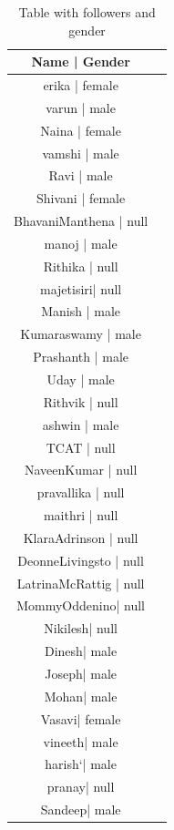 \begin{table}

\caption{Table with followers and gender}
\label{Table:q1table1}
\begin{center}
\begin{tabular}{| c | c |}
\hline

 Name | Gender\\ \hline
 erika  | female\\ \hline		
 varun  | male\\ \hline		
 Naina  | female\\ \hline		
 vamshi | male\\ \hline		
 Ravi  | male\\ \hline
 Shivani  | female\\ \hline	
 BhavaniManthena    | null\\ \hline
 manoj | male\\ \hline
 Rithika  | null\\ \hline	
 majetisiri| null\\ \hline
 Manish  | male\\ \hline	
 Kumaraswamy | male\\ \hline
 Prashanth  | male\\ \hline	
 Uday  | male\\ \hline
 Rithvik | null\\ \hline
 ashwin | male\\ \hline	
 TCAT | null\\ \hline
 NaveenKumar   | null\\ \hline	
 pravallika | null\\ \hline
 maithri  | null\\ \hline	
 KlaraAdrinson  | null\\ \hline
 DeonneLivingsto  | null\\ \hline
 LatrinaMcRattig  | null\\ \hline
MommyOddenino| 		null\\ \hline		
Nikilesh|	null\\ \hline		
Dinesh| 	male\\ \hline		
Joseph|	male\\ \hline		
Mohan| 		male\\ \hline
Vasavi|		female\\ \hline	
vineeth| 	male\\ \hline
harish`| 	male\\ \hline
pranay| 		null\\ \hline	
Sandeep| 		male\\ \hline

\end{tabular}
\end{center}
\end{table}
